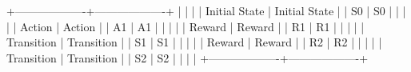 +-------------------+-------------------+
|                   |                   |
|   Initial State   |   Initial State   |
|   S0              |   S0              |
|                   |                   |
|   Action          |   Action          |
|   A1              |   A1              |
|                   |                   |
|   Reward          |   Reward          |
|   R1              |   R1              |
|                   |                   |
|   Transition      |   Transition      |
|   S1              |   S1              |
|                   |                   |
|   Reward          |   Reward          |
|   R2              |   R2              |
|                   |                   |
|   Transition      |   Transition      |
|   S2              |   S2              |
|                   |                   |
+-------------------+-------------------+